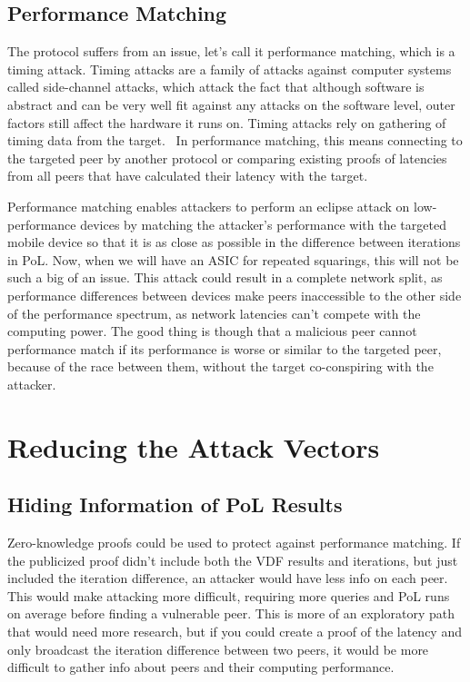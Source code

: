 \subsection{Performance Matching}
The protocol suffers from an issue, let's call it performance matching, which is a timing attack. Timing attacks are a family of attacks against computer systems called side-channel attacks, which attack the fact that although software is abstract and can be very well fit against any attacks on the software level, outer factors still affect the hardware it runs on. Timing attacks rely on gathering of timing data from the target.~\cite{noauthor_undated-mp} In performance matching, this means connecting to the targeted peer by another protocol or comparing existing proofs of latencies from all peers that have calculated their latency with the target.

Performance matching enables attackers to perform an eclipse attack on low-performance devices by matching the attacker's performance with the targeted mobile device so that it is as close as possible in the difference between iterations in PoL. Now, when we will have an ASIC for repeated squarings, this will not be such a big of an issue. This attack could result in a complete network split, as performance differences between devices make peers inaccessible to the other side of the performance spectrum, as network latencies can't compete with the computing power. The good thing is though that a malicious peer cannot performance match if its performance is worse or similar to the targeted peer, because of the race between them, without the target co-conspiring with the attacker.

\section{Reducing the Attack Vectors}
\subsection{Hiding Information of PoL Results}
Zero-knowledge proofs could be used to protect against performance matching. If the publicized proof didn't include both the VDF results and iterations, but just included the iteration difference, an attacker would have less info on each peer. This would make attacking more difficult, requiring more queries and PoL runs on average before finding a vulnerable peer. This is more of an exploratory path that would need more research, but if you could create a proof of the latency and only broadcast the iteration difference between two peers, it would be more difficult to gather info about peers and their computing performance.

